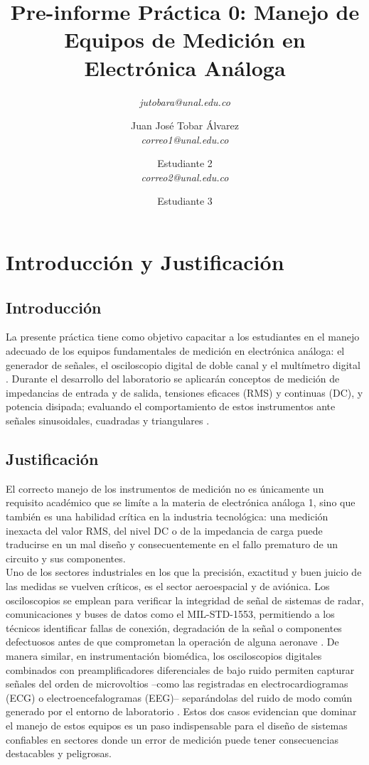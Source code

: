 \documentclass[journal, a4paper]{IEEEtran}
\title{Pre-informe Práctica 0: Manejo de Equipos de Medición en Electrónica Análoga}
\author{
    \textit{jutobara@unal.edu.co} \and
    Juan José Tobar Álvarez\\ \textit{correo1@unal.edu.co} \and
    Estudiante 2\\ \textit{correo2@unal.edu.co} \and
    Estudiante 3\\ 
}
\begin{document}
\maketitle

\section{Introducción y Justificación}

\subsection{Introducción}
La presente práctica tiene como objetivo capacitar a los estudiantes en
 el manejo adecuado de los equipos fundamentales de medición en 
 electrónica análoga: el generador de señales, el osciloscopio digital 
 de doble canal y el multímetro digital \cite{guia_practica0}. 
 Durante el desarrollo del laboratorio se aplicarán conceptos de 
 medición de impedancias de entrada y de salida, tensiones eficaces 
 (RMS) y continuas (DC), y potencia disipada; evaluando el 
 comportamiento de estos instrumentos ante señales sinusoidales, 
 cuadradas y triangulares \cite{sedra2020}. %

\subsection{Justificación}
El correcto manejo de los instrumentos de medición no es únicamente un requisito 
académico que se limíte a la materia de electrónica análoga 1,
sino que también es una habilidad crítica en la industria tecnológica: 
una medición inexacta del valor RMS, del nivel DC o de la impedancia 
de carga puede traducirse en un mal diseño y consecuentemente en el fallo prematuro de 
un circuito y sus componentes. \\
Uno de los sectores industriales en los que la precisión, exactitud y buen juicio de las medidas se vuelven críticos, 
es el sector aeroespacial y de aviónica. Los osciloscopios
se emplean para verificar la integridad de señal de sistemas de radar,
comunicaciones y buses de datos como el MIL-STD-1553, permitiendo a 
los técnicos identificar fallas de conexión, degradación de la señal 
o componentes defectuosos antes de que comprometan la operación de alguna
aeronave \cite{militaryaerospace_scopes,pilotjohn_scopes}. 
De manera similar, en instrumentación biomédica, los osciloscopios 
digitales combinados con preamplificadores diferenciales de bajo ruido 
permiten capturar señales del orden de microvoltios 
--como las registradas en electrocardiogramas (ECG) o 
electroencefalogramas (EEG)-- separándolas del ruido de modo común 
generado por el entorno de laboratorio \cite{tektronix_biomedical}. 
Estos dos casos evidencian que dominar el manejo de estos equipos es 
un paso indispensable para el diseño de sistemas confiables en 
sectores donde un error de medición puede tener consecuencias destacables y peligrosas.
\end{document}
